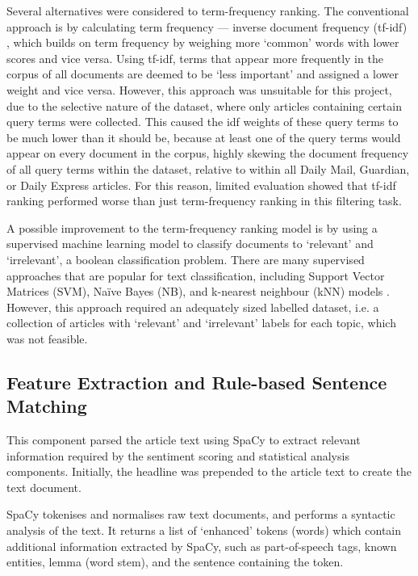 \documentclass{report}
\begin{document}
Several alternatives were considered to term-frequency ranking.
The conventional approach is by calculating term frequency --- inverse document frequency (tf-idf) \cite{robertson2004understanding, sparck1972statistical}, which builds on term frequency by weighing more `common' words with lower scores and vice versa.
Using tf-idf, terms that appear more frequently in the corpus of all documents are deemed to be `less important' and assigned a lower weight and vice versa.
However, this approach was unsuitable for this project, due to the selective nature of the dataset, where only articles containing certain query terms were collected. 
This caused the idf weights of these query terms to be much lower than it should be, because at least one of the query terms would appear on every document in the corpus, highly skewing the document frequency of all query terms within the dataset, relative to within all Daily Mail, Guardian, or Daily Express articles.
For this reason, limited evaluation showed that tf-idf ranking performed worse than just term-frequency ranking in this filtering task.

A possible improvement to the term-frequency ranking model is by using a supervised machine learning model to classify documents to `relevant' and `irrelevant', a boolean classification problem.
There are many supervised approaches that are popular for text classification, including Support Vector Matrices (SVM), Na\"{i}ve Bayes (NB), and k-nearest neighbour (kNN) models \cite{khan2010review}.
However, this approach required an adequately sized labelled dataset, i.e. a collection of articles with `relevant' and `irrelevant' labels for each topic, which was not feasible.

\subsection{Feature Extraction and Rule-based Sentence Matching} \label{des-matching}

This component parsed the article text using SpaCy \cite{SpaCy} to extract relevant information required by the sentiment scoring and statistical analysis components.
Initially, the headline was prepended to the article text to create the text document.

SpaCy tokenises and normalises raw text documents, and performs a syntactic analysis of the text. 
It returns a list of `enhanced' tokens (words) which contain additional information extracted by SpaCy, such as part-of-speech tags, known entities, lemma (word stem), and the sentence containing the token.
\end{document}
